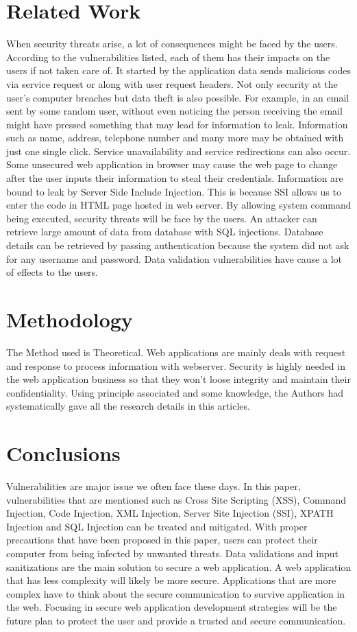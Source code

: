 \documentclass[a4paper,12pt]{article}
\begin{document}
\section{Related Work}
When security threats arise, a lot of consequences might be faced by the users. According to the vulnerabilities listed, each of them has their impacts on the users if not taken care of. It started by the application data sends malicious codes via service request or along with user request headers. Not only security at the user’s computer breaches but data theft is also possible. For example, in an email sent by some random user, without even noticing the person receiving the email might have pressed something that may lead for information to leak. Information such as name, address, telephone number and many more may be obtained with just one single click. Service unavailability and service redirections can also occur. Some unsecured web application in browser may cause the web page to change after the user inputs their information to steal their credentials. Information are bound to leak by Server Side Include Injection. This is because SSI allows us to enter the code in HTML page hosted in web server. By allowing system command being executed, security threats will be face by the users. An attacker can retrieve large amount of data from database with SQL injections. Database details can be retrieved by passing authentication because the system did not ask for any username and password. Data validation vulnerabilities have cause a lot of effects to the users.
\section{Methodology}
The Method used is Theoretical. Web applications are mainly deals with request and response to process information with webserver. Security is highly needed in the web application business so that they won't loose integrity and maintain their confidentiality. Using principle associated and some knowledge, the Authors had systematically gave all the research details in this articles.

\section{Conclusions}
Vulnerabilities are major issue we often face these days. In this paper, vulnerabilities that are mentioned such as Cross Site Scripting (XSS), Command Injection, Code Injection, XML Injection, Server Site Injection (SSI), XPATH Injection and SQL Injection can be treated and mitigated. With proper precautions that have been proposed in this paper, users can protect their computer from being infected by unwanted threats. Data validations and input sanitizations are the main solution to secure a web application. A web application that has less complexity will likely be more secure.  Applications that are more complex have to think about the secure communication to survive application in the web. Focusing in secure web application development strategies will be the future plan to protect the user and provide a trusted and secure communication.
\end{document}

